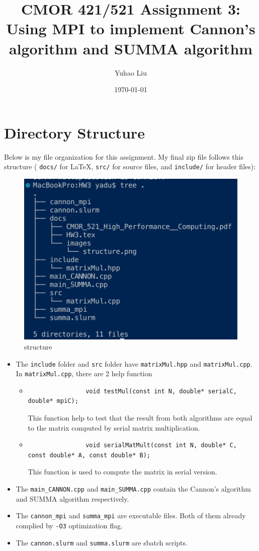 \documentclass[11pt]{article}
\title{CMOR 421/521 Assignment 3: Using MPI to implement Cannon's algorithm and SUMMA algorithm}
\author{Yuhao Liu}
\date{\today}
\begin{document}
\maketitle

\tableofcontents
\bigskip

\newpage

\section{Directory Structure}
Below is my file organization for this assignment. 
My final zip file follows this structure ( \texttt{docs/} for LaTeX, \texttt{src/} for source files, and \texttt{include/} for header files):

\begin{figure}[H]
    \centering
    \includegraphics[width=0.3\linewidth]{Assignments/HW3/docs/images/structure.png}
    \caption{structure}
    \label{fig:structure}
\end{figure}

\begin{itemize}
    \item The \verb|include| folder and \verb|src| folder have \verb|matrixMul.hpp| and \verb|matrixMul.cpp|. In \verb|matrixMul.cpp|, there are 2 help function 
        \begin{itemize}
            \item \begin{verbatim}
                void testMul(const int N, double* serialC, double* mpiC);
            \end{verbatim}
                This function help to test that the result from both algorithms are equal to the matrix computed by serial matrix multiplication.
            \item \begin{verbatim}
                void serialMatMult(const int N, double* C, const double* A, const double* B);
            \end{verbatim}
                This function is used to compute the matrix in serial version.
        \end{itemize}
    \item The \verb|main_CANNON.cpp| and \verb|main_SUMMA.cpp| contain the Cannon's algorithm and SUMMA algorithm respectively.
    \item The \verb|cannon_mpi| and \verb|summa_mpi| are executable files. Both of them already complied by \verb|-O3| optimization flag.
    \item The \verb|cannon.slurm| and \verb|summa.slurm| are sbatch scripts.
\end{itemize}
\end{document}
